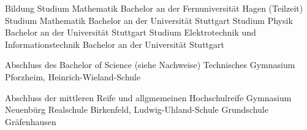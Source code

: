 \begin{rubric}{\textcolor{black!20!blue!100}{Bildung}}%
	\entry*[04/2018 --- 2019]
		Studium Mathematik Bachelor an der Fernuniversität Hagen (Teilzeit)
	\entry*[10/2014 --- 03/2018]
		Studium Mathematik Bachelor an der Universität Stuttgart
	\entry*[10/2013 --- 09/2016]
		Studium Physik Bachelor an der Universität Stuttgart
	\entry*[10/2012 --- 08/2016]
		Studium Elektrotechnik und Informationstechnik Bachelor an der Universität Stuttgart
		
		Abschluss des Bachelor of Science (siehe Nachweise)
	\entry*[09/2009 --- 06/2012]
		Technisches Gymnasium Pforzheim, Heinrich-Wieland-Schule
		
		Abschluss der mittleren Reife und allgmemeinen Hochschulreife
	\entry*[09/2005 --- 07/2009]
		Gymnasium Neuenbürg
	\entry*[09/2004 --- 07/2005]
		Realschule Birkenfeld, Ludwig-Uhland-Schule
	\entry*[09/2000 --- 07/2004]
		Grundschule Gräfenhausen
\end{rubric}